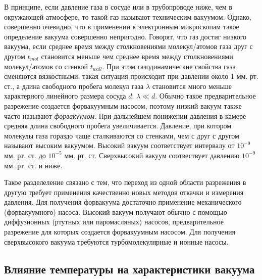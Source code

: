 \documentclass[12pt]{article}
\begin{document}
В принципе, если давление газа в сосуде или в трубопроводе ниже, чем в окружающей атмосфере, то такой газ называют техническим вакуумом. Однако, совершенно очевидно, что в применении к электронным микроскопам такое определение вакуума совершенно непригодно. Говорят, что газ достиг низкого вакуума, если среднее время между столкновениями молекул/атомов газа друг с другом $t_{mol}$ становится меньше чем среднее время между столкновениями молекул/атомов со стенкой $t_{wall}$. При этом газодинамические свойства газа сменяются вязкостными, такая ситуация происходит при давлении около 1 мм. рт. ст., а длина свободного пробега молекул газа $\lambda$ становится много меньше характерного линейного размера сосуда $d$: $\lambda \ll d$. Обычно такое предварительное разрежение создается форвакуумным насосом, поэтому низкий вакуум также часто называют \textit{форвакуумом}. При дальнейшем понижении давления в камере средняя длина свободного пробега увеличивается. Давление, при котором молекулы газа гораздо чаще сталкиваются со стенками, чем с друг с другом называют высоким вакуумом. Высокий вакуум соответствует интервалу от $10^{-9}$ мм. рт. ст. до $10^{-5}$ мм. рт. ст. Сверхвысокий вакуум соотвествует давлению $10^{-9}$ мм. рт. ст. и ниже. \par
Такое разделеление связано с тем, что переход из одной области разрежения в другую требует применения качественно новых методов откачки и измерения давления. Для получения форвакуума достаточно применение механического (форвакуумного) насоса. Высокий вакуум получают обычно с помощью диффузионных (ртутных или паромасляных) насосов, предварительное разрежение для которых создается форвакуумным насосом. Для получения сверхвысокого вакуума требуются турбомолекулярные и ионные насосы.

\subsection*{Влияние температуры на характеристики вакуума}
\end{document}
